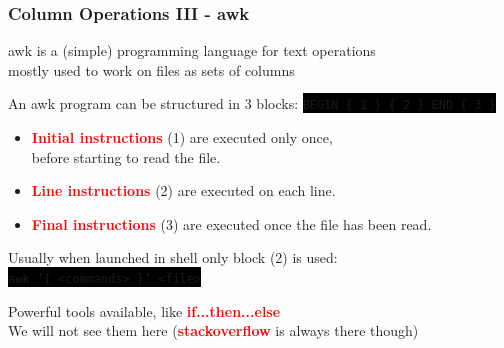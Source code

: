 \documentclass[unknownkeysallowed, 10pt, a4 paper, handout]{beamer}
\newcommand{\focus}[1]{\textbf{\textcolor{red}{#1}}}
\newcommand{\code}[1]{\colorbox{black}{\color{green}\texttt{#1}}}
\begin{document}
\begin{frame}
  \begin{center}
    \frametitle{Column Operations III - awk}

    awk is a (simple) programming language for text operations\\
    mostly used to work on files as sets of columns

    \vspace{1mm}

    An awk program can be structured in 3 blocks:
    \code{BEGIN \{ 1 \} \{ 2 \} END \{ 3 \}}

    \vspace{1mm}

    \begin{itemize}
      \item \focus{Initial instructions} (1) are executed only once,\\
        before starting to read the file.
      \item \focus{Line instructions} (2) are executed on each line.
      \item \focus{Final instructions} (3) are executed once the file has been read.
    \end{itemize}

    \vspace{1mm}

    Usually when launched in shell only block (2) is used:\\
    \code{awk '\{ <commands> \}' <file>}

    \vspace{2mm}

    Powerful tools available, like \focus{if...then...else}\\
    We will not see them here (\focus{stackoverflow} is always there though)
  \end{center}
\end{frame}
\end{document}

